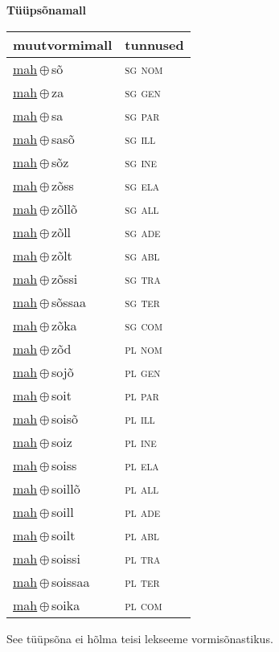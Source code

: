 

\vspace{3.5em}
\noindent \begin{minipage}{\textwidth}
\noindent \textbf{Tüüpsõnamall \,}\\

\begin{sideways}
\begin{tabular}{l l}
muutvormimall & tunnused \\
\hline
\underline{mah}\,$\oplus$\,sõ & \textsc{ sg nom } \\
\underline{mah}\,$\oplus$\,za & \textsc{ sg gen } \\
\underline{mah}\,$\oplus$\,sa & \textsc{ sg par } \\
\underline{mah}\,$\oplus$\,sasõ & \textsc{ sg ill } \\
\underline{mah}\,$\oplus$\,sõz & \textsc{ sg ine } \\
\underline{mah}\,$\oplus$\,zõss & \textsc{ sg ela } \\
\underline{mah}\,$\oplus$\,zõllõ & \textsc{ sg all } \\
\underline{mah}\,$\oplus$\,zõll & \textsc{ sg ade } \\
\underline{mah}\,$\oplus$\,zõlt & \textsc{ sg abl } \\
\underline{mah}\,$\oplus$\,zõssi & \textsc{ sg tra } \\
\underline{mah}\,$\oplus$\,sõssaa & \textsc{ sg ter } \\
\underline{mah}\,$\oplus$\,zõka & \textsc{ sg com } \\
\underline{mah}\,$\oplus$\,zõd & \textsc{ pl nom } \\
\underline{mah}\,$\oplus$\,sojõ & \textsc{ pl gen } \\
\underline{mah}\,$\oplus$\,soit & \textsc{ pl par } \\
\underline{mah}\,$\oplus$\,soisõ & \textsc{ pl ill } \\
\underline{mah}\,$\oplus$\,soiz & \textsc{ pl ine } \\
\underline{mah}\,$\oplus$\,soiss & \textsc{ pl ela } \\
\underline{mah}\,$\oplus$\,soillõ & \textsc{ pl all } \\
\underline{mah}\,$\oplus$\,soill & \textsc{ pl ade } \\
\underline{mah}\,$\oplus$\,soilt & \textsc{ pl abl } \\
\underline{mah}\,$\oplus$\,soissi & \textsc{ pl tra } \\
\underline{mah}\,$\oplus$\,soissaa & \textsc{ pl ter } \\
\underline{mah}\,$\oplus$\,soika & \textsc{ pl com } \\
\end{tabular}
\end{sideways}
\label{tab:tüüpsõnamall-mahsõ}

\end{minipage}

 
\vspace{1em}
\noindent See tüüpsõna ei hõlma teisi lekseeme vormi\-sõnastikus.
